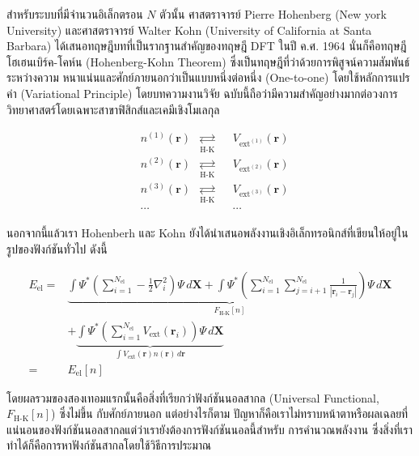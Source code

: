 สำหรับระบบที่มีจำนวนอิเล็กตรอน $N$ ตัวนั้น ศาสตราจารย์ Pierre Hohenberg (New york University) และศาสตราจารย์ Walter Kohn 
(University of California at Santa Barbara) ได้เสนอทฤษฎีบทที่เป็นรากฐานสำคัญของทฤษฎี DFT ในปี ค.ศ. 1964 นั่นก็คือทฤษฎี%
โฮเฮนเบิร์ค-โคห์น (Hohenberg-Kohn Theorem)\autocite{hohenberg1964} ซึ่งเป็นทฤษฎีที่ว่าด้วยการพิสูจน์ความสัมพันธ์ระหว่างความ%
หนาแน่นและศักย์ภายนอกว่าเป็นแบบหนึ่งต่อหนึ่ง (One-to-one) โดยใช้หลักการแปรค่า (Variational Principle) โดยบทความงานวิจัย%
ฉบับนี้ถือว่ามีความสำคัญอย่างมากต่อวงการวิทยาศาสตร์โดยเฉพาะสาขาฟิสิกส์และเคมีเชิงโมเลกุล

\begin{framed}
    \centering
    \begin{align*}
        &n^{(1)}(\bm{r}) &\underset{\text{H-K}}{\rightleftarrows} &&V_{\text{ext}^{(1)}}(\bm{r}) \\[0.5ex]
        &n^{(2)}(\bm{r}) &\underset{\text{H-K}}{\rightleftarrows} &&V_{\text{ext}^{(2)}}(\bm{r}) \\[0.5ex]
        &n^{(3)}(\bm{r}) &\underset{\text{H-K}}{\rightleftarrows} &&V_{\text{ext}^{(3)}}(\bm{r}) \\[0.5ex]
        &\cdots & &&\cdots 
    \end{align*}
\end{framed}

นอกจากนี้แล้วเรา Hohenberh และ Kohn ยังได้นำเสนอพลังงานเชิงอิเล็กทรอนิกส์ที่เขียนให้อยู่ในรูปของฟังก์ชันทั่วไป ดังนี้

\begin{align}\label{eq:ener_univer_ext_pot}
    E_{\text{el}} =& \underbrace{\int \Psi^{\ast} 
    \left ( \sum^{N_{\text{el}}}_{i=1} -\frac{1}{2} \nabla^{2}_{i} \right ) 
    \Psi \, d\bm{X} 
    + \int \Psi^{\ast} 
    \left ( \sum^{N_{\text{el}}}_{i=1} \sum^{N_{\text{el}}}_{j=i+1} \frac{1}{|\bm{r}_{i}-\bm{r}_{j}|} \right ) 
    \Psi \, d\bm{X}}_{\textstyle F_{\text{H-K}}[n]} \nonumber \\
    &+ \underbrace{\int \Psi^{\ast}  
    \left ( \sum^{N_{\text{el}}}_{i=1} V_{\text{ext}}(\bm{r}_{i}) \right ) 
    \Psi \, d\bm{X}%
    }_{\textstyle \int V_{\text{ext}}(\bm{r}) n(\bm{r}) \, d\bm{r}} \\
    =& E_{\text{el}}[n]
\end{align}

\noindent โดยผลรวมของสองเทอมแรกนั้นคือสิ่งที่เรียกว่าฟังก์ชันนอลสากล (Universal Functional, $F_{\text{H-K}}[n]$) ซึ่งไม่ขึ้น%
กับศักย์ภายนอก แต่อย่างไรก็ตาม ปัญหาก็คือเราไม่ทราบหน้าตาหรือผลเฉลยที่แน่นอนของฟังก์ชันนอลสากลแต่ว่าเรายังต้องการฟังก์ชันนอลนี้สำหรับ%
การคำนวณพลังงาน ซึ่งสิ่งที่เราทำได้ก็คือการหาฟังก์ชันสากลโดยใช้วิธีการประมาณ

